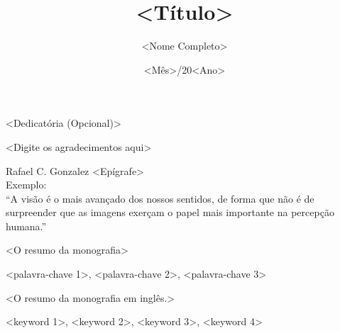 \documentclass[bsc]{ufpethesis}
\institute{\mbox{}}
\title{<Título>}
\date{<Mês>/20<Ano>}
\author{<Nome Completo>}
\begin{document}
\frontmatter

\frontpage

\presentationpage

\begin{dedicatory}
<Dedicatória (Opcional)>
\end{dedicatory}

\acknowledgements
<Digite os agradecimentos aqui>

\begin{epigraph}[]{Rafael C. Gonzalez}
<Epígrafe>\\
Exemplo:\\
“A visão é o mais avançado dos nossos sentidos, de forma que não é de surpreender que as imagens exerçam o papel mais importante na percepção humana.”
\end{epigraph}

\resumo
<O resumo da monografia>
\begin{keywords}
<palavra-chave 1>, <palavra-chave 2>, <palavra-chave 3>
\end{keywords}

\abstract
<O resumo da monografia em inglês.>
\begin{keywords}
<keyword 1>, <keyword 2>, <keyword 3>, <keyword 4>
\end{keywords}

\tableofcontents

\listoffigures

\listoftables
\end{document}
